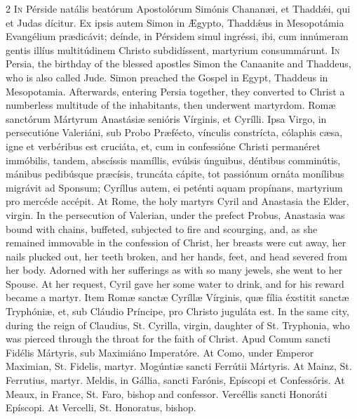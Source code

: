 \begin{paracol}{2}
\lettrine[lines=2]{I}{n} Pérside natális 
 beatórum Apostolórum Simónis Chananæi, et Thaddǽi, qui et Judas dícitur. 
 Ex ipsis autem Simon in Ægypto, Thaddǽus in Mesopotámia Evangélium 
 prædicávit; deínde, in Pérsidem simul ingréssi, ibi, cum innúmeram gentis illíus multitúdinem Christo subdidíssent, martyrium consummárunt.
\switchcolumn
{}
\lettrine[lines=2]{I}{n} Persia, the birthday of the 
 blessed apostles Simon the Canaanite and Thaddeus, who is also called Jude. 
 Simon preached the Gospel in Egypt, Thaddeus in Mesopotamia. 
 Afterwards, entering Persia together, they converted to Christ a numberless 
 multitude of the inhabitants, then underwent martyrdom.
\switchcolumn*
{}
Romæ sanctórum Mártyrum 
 Anastásiæ senióris Vírginis, et Cyrílli. Ipsa Virgo, in persecutióne 
 Valeriáni, sub Probo Præfécto, vínculis constrícta, cólaphis cæsa, igne et 
 verbéribus est cruciáta, et, cum in confessióne Christi permanéret immóbilis, 
 tandem, abscíssis mamíllis, evúlsis únguibus, déntibus comminútis, mánibus 
 pedibúsque præcísis, truncáta cápite, tot passiónum ornáta monílibus 
 migrávit ad Sponsum; Cyríllus autem, ei peténti aquam propínans, martyrium 
 pro mercéde accépit.
\switchcolumn
{}
At Rome, the holy martyrs Cyril and 
 Anastasia the Elder, virgin. In the persecution of Valerian, under the 
 prefect Probus, Anastasia was bound with chains, buffeted, subjected to fire 
 and scourging, and, as she remained immovable in the confession of Christ, 
 her breasts were cut away, her nails plucked out, her teeth broken, and her 
 hands, feet, and head severed from her body. Adorned with her 
 sufferings as with so many jewels, she went to her Spouse. At her 
 request, Cyril gave her some water to drink, and for his reward became a 
 martyr.
\switchcolumn*
{}
Item Romæ sanctæ 
 Cyríllæ Vírginis, quæ fília éxstitit sanctæ Tryphóniæ, et, sub Cláudio 
 Príncipe, pro Christo juguláta est.
\switchcolumn
{}
In the same city, during the reign 
 of Claudius, St. Cyrilla, virgin, daughter of St. Tryphonia, who was pierced 
 through the throat for the faith of Christ.
\switchcolumn*
{}
Apud Comum sancti 
 Fidélis Mártyris, sub Maximiáno Imperatóre.
\switchcolumn
{}
At Como, under Emperor Maximian, St. 
 Fidelis, martyr.
\switchcolumn*
{}
Mogúntiæ sancti 
 Ferrútii Mártyris.
\switchcolumn
{}
At Mainz, St. Ferrutius, martyr.
\switchcolumn*
{}
Meldis, in Gállia, 
 sancti Farónis, Epíscopi et Confessóris.
\switchcolumn
{}
At Meaux, in France, St. Faro, 
 bishop and confessor.
\switchcolumn*
{}
Vercéllis sancti 
 Honoráti Epíscopi.
\switchcolumn
{}
At Vercelli, St. Honoratus, bishop.
\switchcolumn*
{}
\end{paracol}


